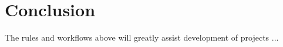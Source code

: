 \documentclass{article}
\begin{document}
\section{Conclusion} 
\label{sec:conclusion}

The rules and workflows above will greatly assist development of projects ...








\end{document}
